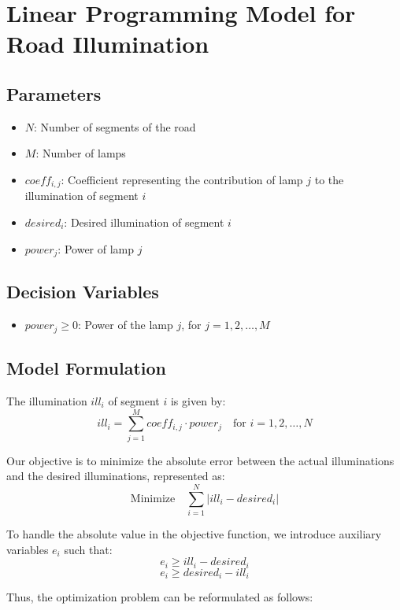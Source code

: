 \documentclass{article}
\begin{document}
\section*{Linear Programming Model for Road Illumination}

\subsection*{Parameters}
\begin{itemize}
    \item $N$: Number of segments of the road
    \item $M$: Number of lamps
    \item $coeff_{i,j}$: Coefficient representing the contribution of lamp $j$ to the illumination of segment $i$
    \item $desired_i$: Desired illumination of segment $i$
    \item $power_j$: Power of lamp $j$
\end{itemize}

\subsection*{Decision Variables}
\begin{itemize}
    \item $power_j \geq 0$: Power of the lamp $j$, for $j = 1, 2, \ldots, M$
\end{itemize}

\subsection*{Model Formulation}
The illumination $ill_i$ of segment $i$ is given by:
\[
ill_i = \sum_{j=1}^{M} coeff_{i,j} \cdot power_j \quad \text{for } i = 1, 2, \ldots, N
\]

Our objective is to minimize the absolute error between the actual illuminations and the desired illuminations, represented as:
\[
\text{Minimize} \quad \sum_{i=1}^{N} |ill_i - desired_i|
\]

To handle the absolute value in the objective function, we introduce auxiliary variables $e_i$ such that:
\[
e_i \geq ill_i - desired_i
\]
\[
e_i \geq desired_i - ill_i
\]

Thus, the optimization problem can be reformulated as follows:
\end{document}
